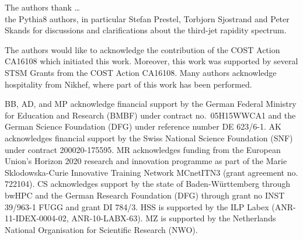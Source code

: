 The authors thank \ldots \\
the {\sc Pythia8} authors, in particular Stefan Prestel, Torbjorn Sjostrand and Peter Skands for 
discussions and clarifications about the third-jet rapidity spectrum. 

The authors would like to acknowledge the contribution of the COST Action CA16108 which initiated this work.
Moreover, this work was supported by several STSM Grants from the COST Action CA16108.
Many authors acknowledge hospitality from Nikhef, where part of this work has been performed.

BB, AD, and MP acknowledge financial support by the
German Federal Ministry for Education and Research (BMBF) under
contract no.~05H15WWCA1 and the German Science Foundation (DFG) under
reference number DE 623/6-1.
AK acknowledges financial support by the Swiss National Science Foundation (SNF) under contract 200020-175595.
MR acknowledges funding from the European Union's Horizon 2020 research and innovation programme as part of the Marie Sklodowska-Curie Innovative Training Network MCnetITN3 (grant agreement no. 722104).
CS acknowledges support by the state of Baden-W\"urttemberg through bwHPC and the German Research Foundation (DFG) through grant no INST 39/963-1 FUGG and grant DI 784/3.
HSS is supported by the ILP Labex (ANR-11-IDEX-0004-02, ANR-10-LABX-63).
MZ is supported by the Netherlands National Organisation for Scientific Research (NWO).
